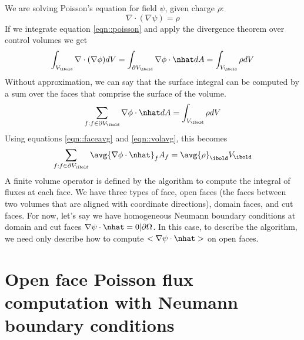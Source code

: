 \documentclass{article}
\begin{document}
We are solving Poisson's equation for field $\psi$, given charge $\rho$:
\begin{equation}
  \nabla \cdot (\nabla \psi) = \rho
  \label{eqn::poisson}
\end{equation}
If we integrate equation \ref{eqn::poisson} and apply the divergence theorem 
over control volumes we get
\begin{equation}
\int_{V_\ibold} \nabla \cdot (\nabla \phi ) dV = \int_{\partial
  V_\ibold} \nabla \phi\cdot \nhat  dA = \int_{V_\ibold} \rho dV
\end{equation}
Without approximation, we can say that the surface integral can be
computed by a sum over the faces that comprise the surface of the
volume.
\begin{equation}
\sum_{f: f \in \partial V_\ibold} \nabla \phi \cdot \nhat dA = \int_{V_\ibold} \rho dV
\end{equation}
Using equations \ref{eqn::faceavg} and \ref{eqn::volavg}, this becomes 
\begin{equation}
\sum_{f: f \in \partial V_\ibold} \avg{\nabla \phi \cdot \nhat}_f A_f
= \avg{\rho}_\ibold V_\ibold
\label{eqn::discretePoisson}
\end{equation}
A finite volume operator is defined by the algorithm to compute the
integral of fluxes at each face.  We have three types of face, open
faces (the faces between two volumes that are aligned with coordinate
directions), domain faces, and cut faces.  For now, let's say we have
homogeneous Neumann boundary conditions at domain and cut faces
$\nabla \psi \cdot \nhat = 0 |\partial \Omega$.  In this case, to
describe the algorithm, we need only describe how to compute $<\nabla
\psi \cdot \nhat>$ on open faces.

\section{Open face Poisson flux computation with Neumann boundary conditions}
\end{document}
